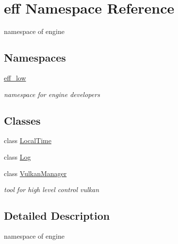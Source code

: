 \hypertarget{namespaceeff}{}\section{eff Namespace Reference}
\label{namespaceeff}


namespace of engine  


\subsection*{Namespaces}
\begin{DoxyCompactItemize}
\item 
 \mbox{\hyperlink{namespaceeff_1_1eff__low}{eff\+\_\+low}}
\begin{DoxyCompactList}\small\item\em namespace for engine developers \end{DoxyCompactList}\end{DoxyCompactItemize}
\subsection*{Classes}
\begin{DoxyCompactItemize}
\item 
class \mbox{\hyperlink{classeff_1_1LocalTime}{Local\+Time}}
\item 
class \mbox{\hyperlink{classeff_1_1Log}{Log}}
\item 
class \mbox{\hyperlink{classeff_1_1VulkanManager}{Vulkan\+Manager}}
\begin{DoxyCompactList}\small\item\em tool for high level control vulkan \end{DoxyCompactList}\end{DoxyCompactItemize}


\subsection{Detailed Description}
namespace of engine 